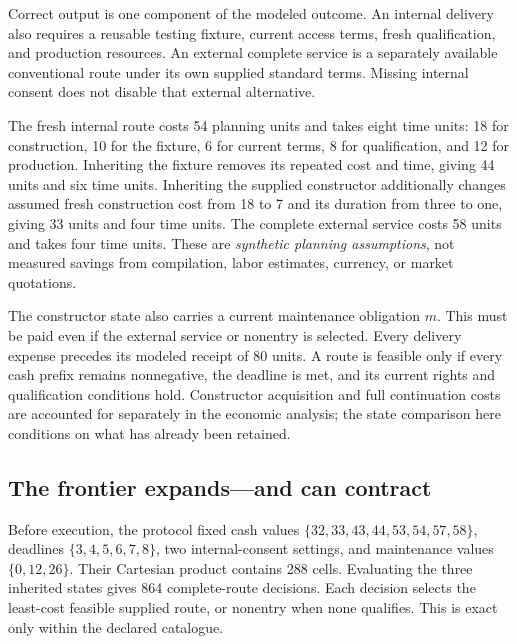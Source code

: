 Correct output is one component of the modeled outcome. An internal delivery
also requires a reusable testing fixture, current access terms, fresh
qualification, and production resources. An external complete service is a
separately available conventional route under its own supplied standard terms.
Missing internal consent does not disable that external alternative.

The fresh internal route costs 54 planning units and takes eight time units:
18 for construction, 10 for the fixture, 6 for current terms, 8 for qualification,
and 12 for production. Inheriting the fixture removes its repeated cost and time,
giving 44 units and six time units. Inheriting the supplied constructor additionally
changes assumed fresh construction cost from 18 to 7 and its duration from three
to one, giving 33 units and four time units. The complete external service costs
58 units and takes four time units. These are \emph{synthetic planning
assumptions}, not measured savings from compilation, labor estimates, currency, or
market quotations.

The constructor state also carries a current maintenance obligation $m$. This
must be paid even if the external service or nonentry is selected. Every delivery
expense precedes its modeled receipt of 80 units. A route is feasible only if
every cash prefix remains nonnegative, the deadline is met, and its current
rights and qualification conditions hold. Constructor acquisition and full
continuation costs are accounted for separately in the economic analysis; the
state comparison here conditions on what has already been retained.

\subsection{The frontier expands---and can contract}

Before execution, the protocol fixed cash values
$\{32,33,43,44,53,54,57,58\}$, deadlines $\{3,4,5,6,7,8\}$, two internal-consent
settings, and maintenance values $\{0,12,26\}$. Their Cartesian product contains
288 cells. Evaluating the three inherited states gives 864 complete-route
decisions. Each decision selects the least-cost feasible supplied route, or
nonentry when none qualifies. This is exact only within the declared catalogue.


